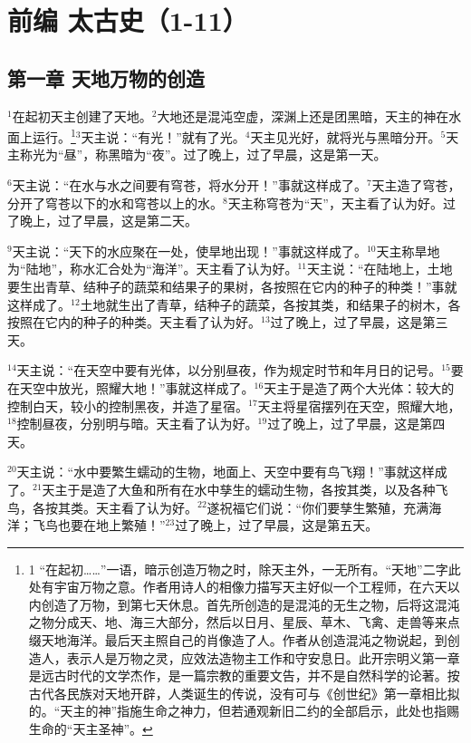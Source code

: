 \section{前编  太古史（1-11）}


\subsection{第一章 天地万物的创造}
\renewcommand{\thefootnote}{\alph{footnote}}

$^{1}$在起初天主创建了天地。$^{2}$大地还是混沌空虚，深渊上还是团黑暗，天主的神在水面上运行。\footnote{1 “在起初……”一语，暗示创造万物之时，除天主外，一无所有。“天地”二字此处有宇宙万物之意。作者用诗人的相像力描写天主好似一个工程师，在六天以内创造了万物，到第七天休息。首先所创造的是混沌的无生之物，后将这混沌之物分成天、地、海三大部分，然后以日月、星辰、草木、飞禽、走兽等来点缀天地海洋。最后天主照自己的肖像造了人。作者从创造混沌之物说起，到创造人，表示人是万物之灵，应效法造物主工作和守安息日。此开宗明义第一章是远古时代的文学杰作，是一篇宗教的重要文告，并不是自然科学的论著。按古代各民族对天地开辟，人类诞生的传说，没有可与《创世纪》第一章相比拟的。“天主的神”指施生命之神力，但若通观新旧二约的全部启示，此处也指赐生命的“天主圣神”。}$^{3}$天主说：“有光！”就有了光。$^{4}$天主见光好，就将光与黑暗分开。$^{5}$天主称光为“昼”，称黑暗为“夜”。过了晚上，过了早晨，这是第一天。

$^{6}$天主说：“在水与水之间要有穹苍，将水分开！”事就这样成了。$^{7}$天主造了穹苍，分开了穹苍以下的水和穹苍以上的水。$^{8}$天主称穹苍为“天”，天主看了认为好。过了晚上，过了早晨，这是第二天。

$^{9}$天主说：“天下的水应聚在一处，使旱地出现！”事就这样成了。$^{10}$天主称旱地为“陆地”，称水汇合处为“海洋”。天主看了认为好。$^{11}$天主说：“在陆地上，土地要生出青草、结种子的蔬菜和结果子的果树，各按照在它内的种子的种类！”事就这样成了。$^{12}$土地就生出了青草，结种子的蔬菜，各按其类，和结果子的树木，各按照在它内的种子的种类。天主看了认为好。$^{13}$过了晚上，过了早晨，这是第三天。

$^{14}$天主说：“在天空中要有光体，以分别昼夜，作为规定时节和年月日的记号。$^{15}$要在天空中放光，照耀大地！”事就这样成了。$^{16}$天主于是造了两个大光体：较大的控制白天，较小的控制黑夜，并造了星宿。$^{17}$天主将星宿摆列在天空，照耀大地，$^{18}$控制昼夜，分别明与暗。天主看了认为好。$^{19}$过了晚上，过了早晨，这是第四天。

$^{20}$天主说：“水中要繁生蠕动的生物，地面上、天空中要有鸟飞翔！”事就这样成了。$^{21}$天主于是造了大鱼和所有在水中孳生的蠕动生物，各按其类，以及各种飞鸟，各按其类。天主看了认为好。$^{22}$遂祝福它们说：“你们要孳生繁殖，充满海洋；飞鸟也要在地上繁殖！”$^{23}$过了晚上，过了早晨，这是第五天。

